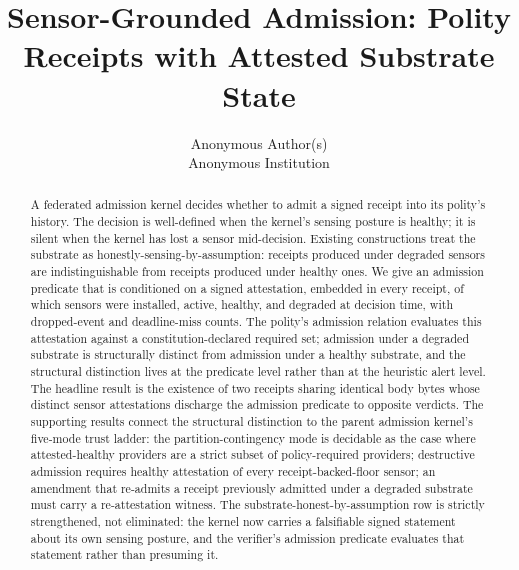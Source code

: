 \documentclass[11pt]{article}
\title{Sensor-Grounded Admission: Polity Receipts with Attested Substrate State}
\author{Anonymous Author(s)\\Anonymous Institution}
\date{}
\begin{document}
\maketitle

\begin{abstract}
A federated admission kernel decides whether to admit a signed receipt into its polity's history. The decision is well-defined when the kernel's sensing posture is healthy; it is silent when the kernel has lost a sensor mid-decision. Existing constructions treat the substrate as honestly-sensing-by-assumption: receipts produced under degraded sensors are indistinguishable from receipts produced under healthy ones. We give an admission predicate that is conditioned on a signed attestation, embedded in every receipt, of which sensors were installed, active, healthy, and degraded at decision time, with dropped-event and deadline-miss counts. The polity's admission relation evaluates this attestation against a constitution-declared required set; admission under a degraded substrate is structurally distinct from admission under a healthy substrate, and the structural distinction lives at the predicate level rather than at the heuristic alert level. The headline result is the existence of two receipts sharing identical body bytes whose distinct sensor attestations discharge the admission predicate to opposite verdicts. The supporting results connect the structural distinction to the parent admission kernel's five-mode trust ladder: the partition-contingency mode is decidable as the case where attested-healthy providers are a strict subset of policy-required providers; destructive admission requires healthy attestation of every receipt-backed-floor sensor; an amendment that re-admits a receipt previously admitted under a degraded substrate must carry a re-attestation witness. The substrate-honest-by-assumption row is strictly strengthened, not eliminated: the kernel now carries a falsifiable signed statement about its own sensing posture, and the verifier's admission predicate evaluates that statement rather than presuming it.
\end{abstract}















\appendix


\end{document}
